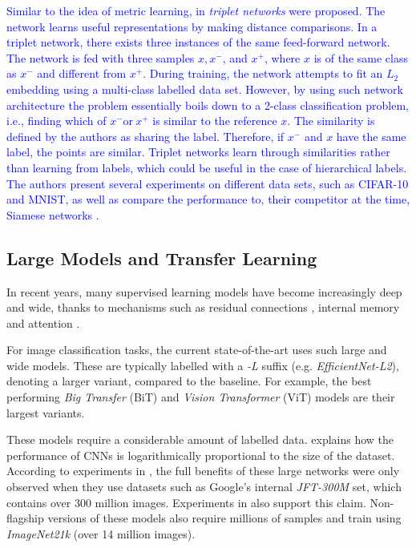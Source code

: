 \documentclass[a4paper,11pt]{article}
\begin{document}
\textcolor{blue}{Similar to the idea of metric learning, in \cite{hoffer2015deep} \textit{triplet networks} were proposed. The network learns useful representations by making distance comparisons. In a triplet network, there exists three instances of the same feed-forward network. The network is fed with three samples $x,x^-$, and $x^+$, where $x$ is of the same class as $x^-$ and different from $x^+$. During training, the network attempts to fit an $L_2$ embedding using a multi-class labelled data set. However, by using such network architecture the problem essentially boils down to a  2-class classification problem, i.e., finding which of $x^- \text{or}~ x^+$ is similar to the reference $x$. The similarity is defined by the authors as sharing the label. Therefore, if $x^-$ and $x$ have the same label, the points are similar. Triplet networks learn through similarities rather than learning from labels, which could be useful in the case of hierarchical labels. The authors present several experiments on different data sets, such as CIFAR-10 and MNIST, as well as compare the performance to, their competitor at the time, Siamese networks \cite{koch2015siamese}.}

\subsection{Large Models and Transfer Learning}
In recent years, many supervised learning models have become increasingly deep and wide, thanks to mechanisms such as residual connections \cite{he2015deep}, internal memory \cite{lstm} and attention \cite{bahdanau2016neural}.

For image classification tasks, the current state-of-the-art uses such large and wide models. These are typically labelled with a \textit{-L} suffix (e.g. \textit{EfficientNet-L2}), denoting a larger variant, compared to the baseline. For example, the best performing \textit{Big Transfer} (BiT) \cite{kolesnikov2020big} and \textit{Vision Transformer} (ViT) \cite{dosovitskiy2020image} models are their largest variants.

These models require a considerable amount of labelled data. \cite{sun17} explains how the performance of CNNs is logarithmically proportional to the size of the dataset. According to experiments in \cite{dosovitskiy2020image}, the full benefits of these large networks were only observed when they use datasets such as Google's internal \textit{JFT-300M} set, which contains over 300 million images. Experiments in \cite{koch2015siamese} also support this claim. Non-flagship versions of these models also require millions of samples and train using \textit{ImageNet21k} (over 14 million images).
\end{document}
